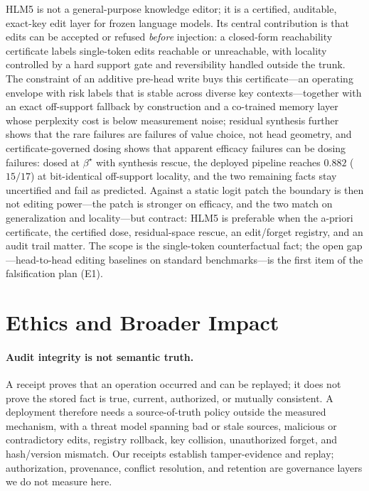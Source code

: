 \documentclass[11pt]{article}
\theoremstyle{remark}
\begin{document}
HLM5 is not a general-purpose knowledge editor; it is a certified, auditable,
exact-key edit layer for frozen language models. Its central contribution is that
edits can be accepted or refused \emph{before} injection: a closed-form
reachability certificate labels single-token edits reachable or unreachable, with
locality controlled by a hard support gate and reversibility handled outside the
trunk. The constraint of an additive pre-head write buys this certificate---an
operating envelope with risk labels that is stable across diverse key
contexts---together with an exact off-support fallback by construction and a
co-trained memory layer whose perplexity cost is below measurement noise;
residual synthesis further shows that the rare failures are failures of value
choice, not head geometry, and certificate-governed dosing shows that apparent
efficacy failures can be dosing failures: dosed at $\beta^{\star}$ with
synthesis rescue, the deployed pipeline reaches $0.882$ ($15/17$) at
bit-identical off-support locality, and the two remaining facts stay
uncertified and fail as predicted. Against a static logit patch the boundary
is then not editing power---the patch is stronger on efficacy, and the two
match on generalization and locality---but contract: HLM5
is preferable when the a-priori certificate, the certified dose, residual-space
rescue, an edit/forget registry, and an audit trail matter.
The scope is the single-token counterfactual fact; the open gap---head-to-head
editing baselines on standard benchmarks---is the first item of the
falsification plan (E1).

\section*{Ethics and Broader Impact}

\paragraph{Audit integrity is not semantic truth.} A receipt proves that an
operation occurred and can be replayed; it does not prove the stored fact is true,
current, authorized, or mutually consistent. A deployment therefore needs a
source-of-truth policy outside the measured mechanism, with a threat model
spanning bad or stale sources, malicious or contradictory edits, registry
rollback, key collision, unauthorized forget, and hash/version mismatch. Our
receipts establish tamper-evidence and replay; authorization, provenance, conflict
resolution, and retention are governance layers we do not measure here.
\end{document}
